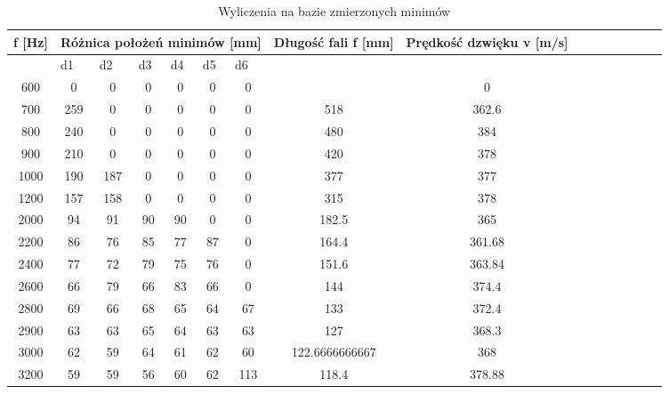 \documentclass{article}
\begin{document}
\begin{table}[h!tbp]
\begin{center}
\centering
\begin{tabular}{|c|c|c|c|c|c|c|c|c|c|c|c|c|c|c|c|}
\hline
\multicolumn{1}{|c|}{f [Hz]} & \multicolumn{ 6}{c|}{Różnica położeń minimów [mm]} & \multicolumn{1}{c|}{Długość fali f [mm]} & \multicolumn{1}{c|}{Prędkość dzwięku v [m/s]} \\ \hline
\multicolumn{1}{|l|}{} & \multicolumn{1}{l|}{d1} & \multicolumn{1}{l|}{d2} & \multicolumn{1}{l|}{d3} & \multicolumn{1}{l|}{d4} & \multicolumn{1}{l|}{d5} & \multicolumn{1}{l|}{d6} & \multicolumn{1}{l|}{} & \multicolumn{1}{l|}{} \\ \hline
600 & 0 & 0 & 0 & 0 & 0 & 0 & \multicolumn{1}{l|}{} & 0 \\ \hline
700 & 259 & 0 & 0 & 0 & 0 & 0 & 518 & 362.6 \\ \hline
800 & 240 & 0 & 0 & 0 & 0 & 0 & 480 & 384 \\ \hline
900 & 210 & 0 & 0 & 0 & 0 & 0 & 420 & 378 \\ \hline
1000 & 190 & 187 & 0 & 0 & 0 & 0 & 377 & 377 \\ \hline
1200 & 157 & 158 & 0 & 0 & 0 & 0 & 315 & 378 \\ \hline
2000 & 94 & 91 & 90 & 90 & 0 & 0 & 182.5 & 365 \\ \hline
2200 & 86 & 76 & 85 & 77 & 87 & 0 & 164.4 & 361.68 \\ \hline
2400 & 77 & 72 & 79 & 75 & 76 & 0 & 151.6 & 363.84 \\ \hline
2600 & 66 & 79 & 66 & 83 & 66 & 0 & 144 & 374.4 \\ \hline
2800 & 69 & 66 & 68 & 65 & 64 & 67 & 133 & 372.4 \\ \hline
2900 & 63 & 63 & 65 & 64 & 63 & 63 & 127 & 368.3 \\ \hline
3000 & 62 & 59 & 64 & 61 & 62 & 60 & 122.6666666667 & 368 \\ \hline
3200 & 59 & 59 & 56 & 60 & 62 & 113 & 118.4 & 378.88 \\ \hline
\end{tabular}
\end{center}
\label{}
\caption{Wyliczenia na bazie zmierzonych minimów}
\end{table}



\end{document}
